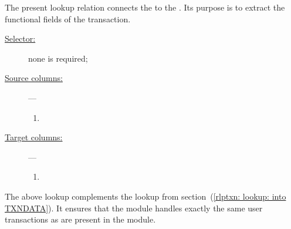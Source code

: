 The present lookup relation connects the \userTxnDataMod{} to the \rlpTxnMod{}. Its purpose is to extract the functional fields of the transaction.
\begin{description}
	\item[\underline{Selector:}]
		none is required;
	\item[\underline{Source columns:}] ---
		\begin{enumerate}
			\item \userTransactionNumber{}
		\end{enumerate}
	\item[\underline{Target columns:}] ---
		\begin{enumerate}
			\item \userTransactionNumber{}
		\end{enumerate}
\end{description}
\saNote{}
The above lookup complements the lookup from
section~(\ref{rlptxn: lookup: into TXNDATA}).
It ensures that the \userTxnDataMod{} module handles exactly
the same user transactions as are present in the \rlpTxnMod{} module.


